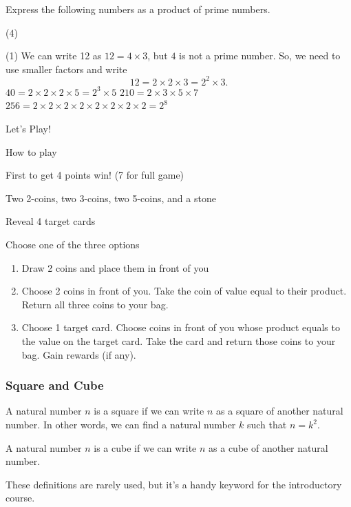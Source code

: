 \begin{frame}[t]
\begin{ex}
Express the following numbers as a product of prime numbers. 
\begin{tasks}(4)
\end{tasks}
\end{ex}
\begin{sol}
\begin{tasks}(1)
\task We can write 12 as $12 = 4 \times 3$, but $4$ is not a prime number. So, we need to use smaller factors and write 
\[12 = 2 \times 2 \times 3 = 2^2 \times 3.\]
\task $40 = 2 \times 2 \times 2 \times 5 = 2^3 \times 5$
\task $210 = 2 \times 3 \times 5 \times 7$
\task $256 = 2 \times 2 \times 2 \times 2 \times 2 \times 2 \times 2 \times 2 = 2^8$
\end{tasks}
\end{sol}
\end{frame}

\begin{frame}{Let's Play!}
\end{frame}

\begin{frame}{How to play}
\begin{description}
\item[Goal] First to get 4 points win! (7 for full game)
\item[Set up] Two 2-coins, two 3-coins, two 5-coins, and a stone
\item Reveal 4 target cards
\item[Turn] Choose one of the three options
\begin{enumerate}
\item Draw 2 coins and place them in front of you
\item Choose 2 coins in front of you. Take the coin of value equal to their product. Return all three coins to your bag.
\item Choose 1 target card. Choose coins in front of you whose product equals to the value on the target card. Take the card and return those coins to your bag. Gain rewards (if any).
\end{enumerate}
\end{description}
\end{frame}

\begin{frame}
\frametitle{Square and Cube}
\begin{defn}{}{}
A natural number $n$ is a square if we can write $n$ as a square of another natural number. In other words, we can find a natural number $k$ such that $n = k^2$.
\medskip

A natural number $n$ is a cube if we can write $n$ as a cube of another natural number.
\end{defn}
These definitions are rarely used, but it's a handy keyword for the introductory course.
\end{frame}


